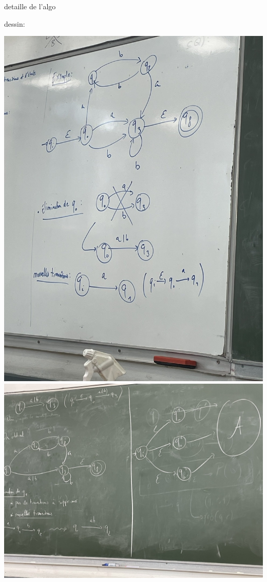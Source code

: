     \begin{example}{detaille de l'algo }{}
        
        dessin:
        
        \includegraphics[scale=0.2]{Dessin/Tableau1.jpeg}%
        \vspace{2cm}
        \includegraphics[scale=0.2]{Dessin/Tableau2.jpeg}

\end{example}
